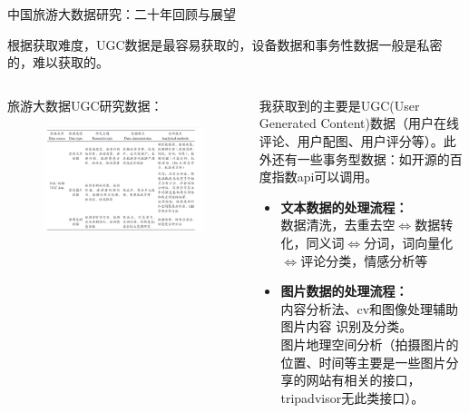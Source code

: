 \documentclass[10pt]{beamer}
\begin{document}
\begin{frame}{\normalsize{中国旅游大数据研究：二十年回顾与展望}}
{根据获取难度，UGC数据是最容易获取的，设备数据和事务性数据一般是私密的，难以获取的。
\begin{columns}
    \begin{column}{0.5\textwidth}
        旅游大数据UGC研究数据：
        \begin{figure}
            \includegraphics[width=1\textwidth]{figures/UGC数据研究方法.png}
        \end{figure}
    \end{column}
    \begin{column}{0.5\textwidth}
        我获取到的主要是UGC(User Generated Content)数据（用户在线评论、用户配图、用户评分等）。此外还有一些事务型数据：如开源的百度指数api可以调用。
        \begin{itemize}
            \item \textbf{文本数据的处理流程：}\\数据清洗，去重去空$\Longleftrightarrow$数据转化，同义词$\Longleftrightarrow$分词，词向量化$\Longleftrightarrow$评论分类，情感分析等
            \item \textbf{图片数据的处理流程：}
            \\内容分析法、cv和图像处理辅助图片内容 识别及分类。\\图片地理空间分析（拍摄图片的位置、时间等主要是一些图片分享的网站有相关的接口，tripadvisor无此类接口）。
        \end{itemize}
    \end{column}
\end{columns}}
\end{frame}
\end{document}
